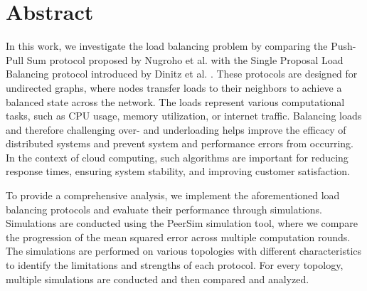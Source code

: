 \chapter*{Abstract}

In this work, we investigate the load balancing problem by comparing the Push-Pull Sum protocol proposed by Nugroho et al. \cite{nugroho2023PushPullSumDataAg} with the Single Proposal Load Balancing protocol introduced by Dinitz et al. \cite{dinitz2022localDealAgreementloadBalancing}. These protocols are designed for undirected graphs, where nodes transfer loads to their neighbors to achieve a balanced state across the network. The loads represent various computational tasks, such as CPU usage, memory utilization, or internet traffic. Balancing loads and therefore challenging over- and underloading helps improve the efficacy of distributed systems and prevent system and performance errors from occurring. In the context of cloud computing, such algorithms are important for reducing response times, ensuring system stability, and improving customer satisfaction.

To provide a comprehensive analysis, we implement the aforementioned load balancing protocols and evaluate their performance through simulations. Simulations are conducted using the PeerSim simulation tool, where we compare the progression of the mean squared error across multiple computation rounds. The simulations are performed on various topologies with different characteristics to identify the limitations and strengths of each protocol. For every topology, multiple simulations are conducted and then compared and analyzed.